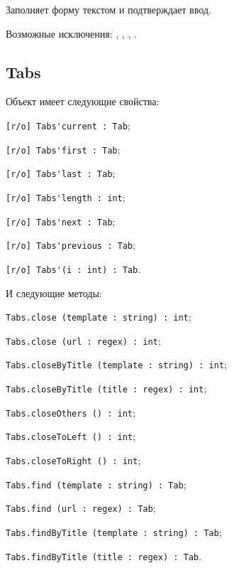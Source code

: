 Заполняет форму текстом  и подтверждает ввод.

Возможные исключения: , , , .


\subsection{{\color{orange} Tabs}}

Объект \tabs{} имеет следующие свойства:
\begin{icItems}
	\item \lstinline|[r/o] Tabs'current : Tab|;
	\item \lstinline|[r/o] Tabs'first : Tab|;
	\item \lstinline|[r/o] Tabs'last : Tab|;
	\item \lstinline|[r/o] Tabs'length : int|;
	\item \lstinline|[r/o] Tabs'next : Tab|;
	\item \lstinline|[r/o] Tabs'previous : Tab|;
	\item \lstinline|[r/o] Tabs'(i : int) : Tab|.
\end{icItems}

И следующие методы:
\begin{icItems}
	\item \lstinline|Tabs.close (template : string) : int|;
	\item \lstinline|Tabs.close (url : regex) : int|;
	\item \lstinline|Tabs.closeByTitle (template : string) : int|;
	\item \lstinline|Tabs.closeByTitle (title : regex) : int|;
	\item \lstinline|Tabs.closeOthers () : int|;
	\item \lstinline|Tabs.closeToLeft () : int|;
	\item \lstinline|Tabs.closeToRight () : int|;
	\item \lstinline|Tabs.find (template : string) : Tab|;
	\item \lstinline|Tabs.find (url : regex) : Tab|;
	\item \lstinline|Tabs.findByTitle (template : string) : Tab|;
	\item \lstinline|Tabs.findByTitle (title : regex) : Tab|.
\end{icItems}

